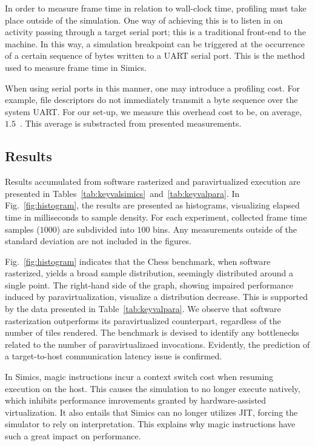 In order to measure frame time in relation to wall-clock time, profiling must take place outside of the simulation.
One way of achieving this is to listen in on activity passing through a target serial port; this is a traditional front-end to the machine.
In this way, a simulation breakpoint can be triggered at the occurrence of a certain sequence of bytes written to a UART serial port.
This is the method used to measure frame time in Simics.

When using serial ports in this manner, one may introduce a profiling cost.
For example, file descriptors do not immediately transmit a byte sequence over the system UART.
For our set-up, we measure this overhead cost to be, on average, $1.5$~\milli\second .
This average is substracted from presented measurements.

\subsection{Results}
\label{sec:results}
Results accumulated from software rasterized and paravirtualized execution are presented in Tables~\ref{tab:keyvalsimics}~and~\ref{tab:keyvalpara}.
In Fig.~\ref{fig:histogram}, the results are presented as histograms, visualizing elapsed time in milliseconds to sample density.
For each experiment, collected frame time samples ($1000$) are subdivided into $100$ bins.
Any measurements outside of the standard deviation are not included in the figures.

Fig.~\ref{fig:histogram} indicates that the Chess benchmark, when software rasterized, yields a broad sample distribution, seemingly distributed around a single point.
The right-hand side of the graph, showing impaired performance induced by paravirtualization, visualize a distribution decrease.
This is supported by the data presented in Table~\ref{tab:keyvalpara}.
We observe that software rasterization outperforms its paravirtualized counterpart, regardless of the number of tiles rendered.
The benchmark is devised to identify any bottlenecks related to the number of paravirtualizaed invocations.
Evidently, the prediction of a target-to-host communication latency issue is confirmed.

In Simics, magic instructions incur a context switch cost when resuming execution on the host.
This causes the simulation to no longer execute natively, which inhibits performance imrovements granted by hardware-assisted virtualization.
It also entails that Simics can no longer utilizes JIT, forcing the simulator to rely on interpretation.
This explains why magic instructions have such a great impact on performance.

